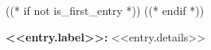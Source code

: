 ((* if not is_first_entry *))
\vspace{<<design.margins.entry_area.vertical_between>>}
((* endif *))

\begin{onecolentry}
    \textbf{<<entry.label>>:} <<entry.details>>
\end{onecolentry}